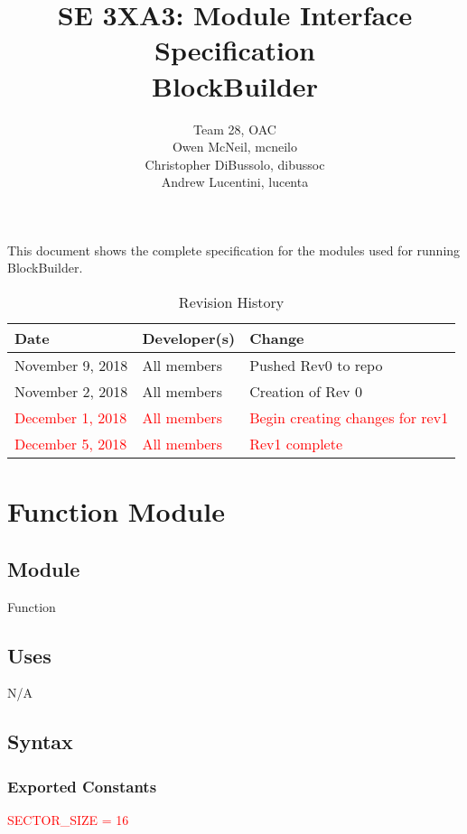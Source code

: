 \documentclass[12pt]{article}
\title{SE 3XA3: Module Interface Specification\\BlockBuilder}
\author{Team 28, OAC
		\\ Owen McNeil, mcneilo
		\\ Christopher DiBussolo, dibussoc
		\\ Andrew Lucentini, lucenta
}
\begin{document}
 
\maketitle

This
document shows the complete specification for the modules used for running BlockBuilder.

\begin{table}[hp]
\caption{Revision History} \label{TblRevisionHistory}
\begin{tabularx}{\textwidth}{llX}
\toprule
\textbf{Date} & \textbf{Developer(s)} & \textbf{Change}\\
\midrule
November 9, 2018 & All members & Pushed Rev0 to repo\\
November 2, 2018 & All members & Creation of Rev 0\\
\textcolor{red}{December 1, 2018} & \textcolor{red}{All members} & \textcolor{red}{Begin creating changes for rev1}\\
\textcolor{red}{December 5, 2018} & \textcolor{red}{All members} & \textcolor{red}{Rev1 complete}\\
\bottomrule
\end{tabularx}
\end{table}

\newpage

\section* {Function Module}

\subsection*{Module}

Function

\subsection* {Uses}

N/A

\subsection* {Syntax}

\subsubsection* {Exported Constants}

\textcolor{red}{SECTOR\_SIZE = 16}
\end{document}
